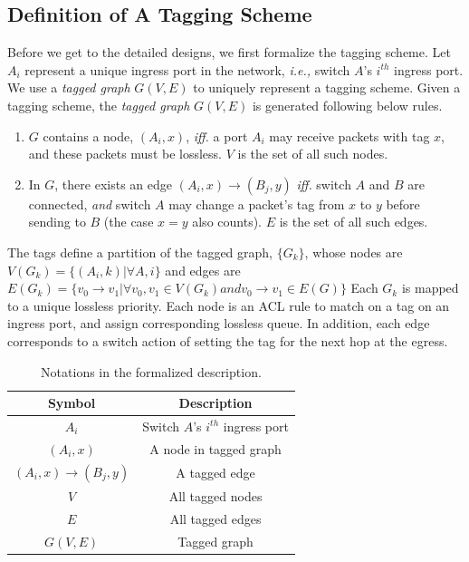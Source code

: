 \subsection{Definition of A Tagging Scheme}

Before we get to the detailed designs, we first formalize the tagging scheme.
Let $A_i$ represent a unique ingress port in the network, {\em i.e.,} switch $A$'s $i^{th}$ ingress port.
We use a {\em tagged graph} $G(V,E)$ to uniquely represent a tagging scheme.
Given a tagging scheme, the {\em tagged graph} $G(V,E)$ is generated following below rules.

\begin{enumerate}
\item $G$ contains a node, $(A_i, x)$, {\em iff.} a port $A_i$ may receive packets with tag $x$, and these packets must 
be lossless. $V$ is the set of all such nodes.
\item In $G$, there exists an edge $(A_i, x)\rightarrow(B_j, y)$ {\em iff.} switch $A$ and $B$ are 
connected, {\em and} switch $A$ may change a packet's tag from $x$ to $y$ before sending to $B$ (the case $x=y$ also counts).
$E$ is the set of all such edges.
\end{enumerate}

The tags define a partition of the tagged graph, $\{G_k\}$, whose nodes are $V(G_k) = \{(A_i,
k) | \forall A, i\}$ and edges are $E(G_k) = \{v_0 \rightarrow v_1 | \forall v_0, v_1 \in V(G_k) and v_0 \rightarrow v_1 \in E(G)\}$
Each $G_k$ is mapped to a unique
lossless priority.  Each node is an ACL rule to match on a tag on an ingress port, and
assign corresponding lossless queue.  In addition, each edge corresponds 
to a switch action of setting the tag for the next hop at the egress.

\begin{table}
\small
\centering
\begin{tabular}{|c|c|}
\hline
Symbol & Description \\ \hline
$A_i$ & Switch $A$'s $i^{th}$ ingress port  \\ \hline
$(A_i, x)$ & A node in tagged graph \\ \hline
$(A_i, x)\rightarrow(B_j, y)$ & A tagged edge \\ \hline
$V$ & All tagged nodes  \\ \hline
$E$ & All tagged edges \\ \hline
$G(V, E)$ & Tagged graph \\ \hline
\end{tabular}
\caption{Notations in the formalized description.}
\label{tab:symbols}
\end{table}

